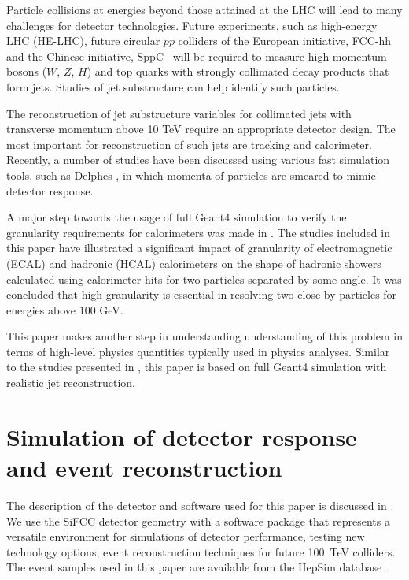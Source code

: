 \documentclass[final,1p,11pt]{elsarticle}
\begin{document}
Particle collisions at energies  beyond those attained at the LHC will lead to many challenges for detector technologies.
Future experiments, such as high-energy LHC (HE-LHC),
future circular $pp$ colliders of the European initiative, FCC-hh~\cite{Benedikt:2206376} and the Chinese initiative, SppC~\cite{Tang:2015qga} will be required to measure high-momentum bosons ($W$, $Z$, $H$) and top quarks with strongly 
collimated decay products that form jets.  Studies of jet substructure can help identify such particles.

The reconstruction of jet substructure  variables for collimated jets with transverse momentum above 10 TeV 
require an appropriate detector design. The most important for reconstruction of such jets are tracking and calorimeter.
Recently, a number of studies \cite{Calkins:2013ega,Chekanov:2015ihl,Coleman:2017fiq} 
have been discussed using various fast simulation tools, such as 
Delphes  \cite{deFavereau:2013fsa}, in which momenta of particles
are smeared to mimic detector response. 

A major step towards the usage of full Geant4 simulation to verify the granularity requirements 
for calorimeters was made in \cite{Chekanov:2016ppq}.
The studies included in this paper have illustrated a significant impact 
of granularity of electromagnetic (ECAL) and hadronic (HCAL) calorimeters on the
shape of hadronic showers  calculated using calorimeter hits 
for two particles separated  by some angle. It was concluded that high granularity is essential 
in resolving two close-by particles for energies above 100 GeV. 

This paper makes another step in understanding understanding of this problem in terms 
of high-level physics quantities typically used in physics analyses.
Similar to the studies presented in \cite{Chekanov:2016ppq}, this paper is based on full
Geant4 simulation with realistic jet reconstruction.

\section{Simulation of detector response and event reconstruction}
 
The description of the detector and software used for this paper is discussed in \cite{Chekanov:2016ppq}. 
We use the SiFCC detector geometry with a software package that
represents a versatile environment for simulations
of detector performance, testing new technology options, event reconstruction techniques for future
100~TeV colliders.
The event samples used in this paper are  available from the
HepSim  database~\cite{Chekanov:2014fga}.
\end{document}
